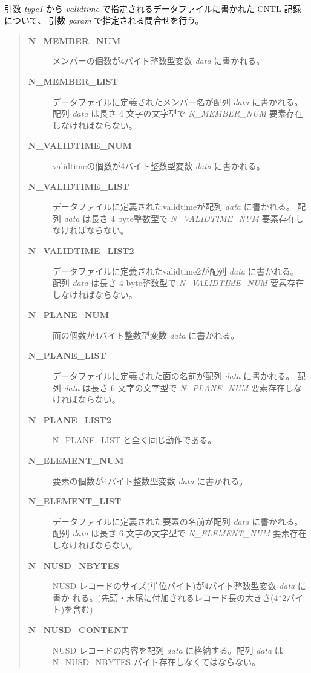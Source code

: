 \paragraph{\FuncDesc}引数 {\it type1} から {\it validtime} で指定されるデータファイルに書かれた
CNTL 記録について、
引数 {\it param} で指定される問合せを行う。
\begin{quote}\begin{description}
\item[{\bf N\_MEMBER\_NUM}] 
メンバーの個数が4バイト整数型変数 {\it data} に書かれる。
\item[{\bf N\_MEMBER\_LIST}] 
データファイルに定義されたメンバー名が配列 {\it data} に書かれる。
配列 {\it data} は長さ 4 文字の文字型で
{\it N\_MEMBER\_NUM} 要素存在しなければならない。
\item[{\bf N\_VALIDTIME\_NUM}] 
validtimeの個数が4バイト整数型変数 {\it data} に書かれる。
\item[{\bf N\_VALIDTIME\_LIST}] 
データファイルに定義されたvalidtimeが配列 {\it data} に書かれる。
配列 {\it data} は長さ 4 byte整数型で
{\it N\_VALIDTIME\_NUM} 要素存在しなければならない。
\item[{\bf N\_VALIDTIME\_LIST2}] 
データファイルに定義されたvalidtime2が配列 {\it data} に書かれる。
配列 {\it data} は長さ 4 byte整数型で
{\it N\_VALIDTIME\_NUM} 要素存在しなければならない。
\item[{\bf N\_PLANE\_NUM}] 
面の個数が4バイト整数型変数 {\it data} に書かれる。
\item[{\bf N\_PLANE\_LIST}] 
データファイルに定義された面の名前が配列 {\it data} に書かれる。
配列 {\it data} は長さ 6 文字の文字型で
{\it N\_PLANE\_NUM} 要素存在しなければならない。
\item[{\bf N\_PLANE\_LIST2}] 
N\_PLANE\_LIST と全く同じ動作である。
\item[{\bf N\_ELEMENT\_NUM}] 
要素の個数が4バイト整数型変数 {\it data} に書かれる。
\item[{\bf N\_ELEMENT\_LIST}] 
データファイルに定義された要素の名前が配列 {\it data} に書かれる。
配列 {\it data} は長さ 6 文字の文字型で
{\it N\_ELEMENT\_NUM} 要素存在しなければならない。
\item[{\bf  N\_NUSD\_NBYTES }] 
NUSD レコードのサイズ(単位バイト)が4バイト整数型変数 {\it data} に書か
れる。(先頭・末尾に付加されるレコード長の大きさ(4$\ast$2バイト)を含む)
\item[{\bf  N\_NUSD\_CONTENT }] 
NUSD レコードの内容を配列 {\it data} に格納する。配列 {\it data} は
\newline N\_NUSD\_NBYTES バイト存在しなくてはならない。

\end{description}
\end{quote}
